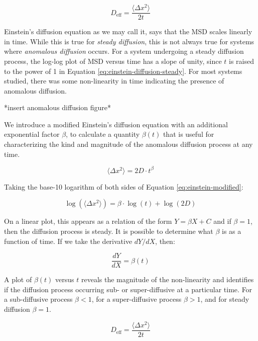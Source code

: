 	\begin{equation}
		D_\textrm{eff} = \dfrac{\langle \Delta x^2 \rangle}{2t}
	\end{equation}	
	
	Einstein's diffusion equation as we may call it, says that the MSD scales linearly in time. While this is true for \textsl{steady diffusion}, this is not always true for systems where \textsl{anomalous diffusion} occurs. For a system undergoing a steady diffusion process, the log-log plot of MSD versus time has a slope of unity, since $ t $ is raised to the power of 1 in Equation \ref{eq:einstein-diffusion-steady}. For most systems studied, there was some non-linearity in time indicating the presence of anomalous diffusion. 
	
	*insert anomalous diffusion figure*
	
	
	We introduce a modified Einstein's diffusion equation with an additional exponential factor $ \beta $, to calculate a quantity $ \beta (t) $ that is useful for characterizing the kind and magnitude of the anomalous diffusion process at any time.
	
	\begin{equation}
	\label{eq:einstein-modified}
		\langle \Delta x^2 \rangle = 2D \cdot t^{\beta}
	\end{equation}
	
	Taking the base-10 logarithm of both sides of Equation \ref{eq:einstein-modified}:

	\begin{equation}
		\log\left( \langle \Delta x^2 \rangle \right) = \beta \cdot \log(t) + \log(2D)
	\end{equation}	
	
	On a linear plot, this appears as a relation of the form $ Y = \beta X + C $ and if $ \beta = 1 $, then the diffusion process is steady. It is possible to determine what $ \beta $ is as a function of time. If we take the derivative $ dY/dX $, then:
	
	\begin{equation}
		\dfrac{dY}{dX} = \beta (t)
	\end{equation}
	
	A plot of $ \beta (t) $ versus $ t $ reveals the magnitude of the non-linearity and identifies if the diffusion process occurring sub- or super-diffusive at a particular time. For a sub-diffusive process $ \beta < 1 $, for a super-diffusive process $ \beta > 1 $, and for steady diffusion $ \beta = 1 $.
	
	\begin{equation}
		D_\textrm{eff} = \dfrac{\langle \Delta x^2 \rangle}{2t}
	\end{equation}
	
